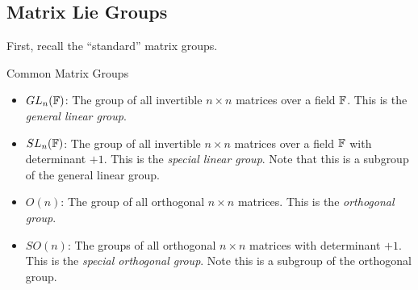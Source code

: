 \subsection{Matrix Lie Groups}
First, recall the ``standard'' matrix groups.
\begin{boxdef}{Common Matrix Groups}{}
    \begin{itemize}
        \item $GL_n(\mathbb{F})$: The group of all invertible $n \times n$ matrices over
        a field $\mathbb{F}$. This is the \textit{general linear group}.
        \item $SL_n(\mathbb{F})$: The group of all invertible $n \times n$ matrices over
        a field $\mathbb{F}$ with determinant $+1$. This is the \textit{special linear group}.
        Note that this is a subgroup of the general linear group.
        \item $O(n)$: The group of all orthogonal $n\times n$ matrices. This is the
        \textit{orthogonal group}.
        \item $SO(n)$: The groups of all orthogonal $n\times n$ matrices with determinant
        $+1$. This is the \textit{special orthogonal group}. Note this is a subgroup
        of the orthogonal group.
    \end{itemize}
\end{boxdef}


